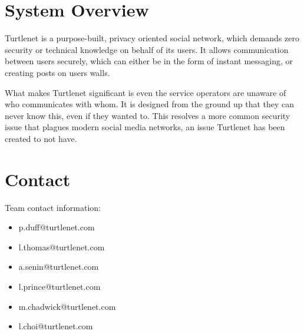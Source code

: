\section{System Overview}
Turtlenet is a purpose-built, privacy oriented social network, which demands
zero security or technical knowledge on behalf of its users. It allows
communication between users securely, which can either be in the form of 
instant messaging, or creating posts on users walls.

What makes Turtlenet significant is even the service operators are unaware of
who communicates with whom. It is designed from the ground up that they can never
know this, even if they wanted to. This resolves a more common security
issue that plagues modern social media networks, an issue Turtlenet has been
created to not have.

\section{Contact}
Team contact information:
\begin{itemize}
\item p.duff@turtlenet.com
\item l.thomas@turtlenet.com
\item a.senin@turtlenet.com
\item l.prince@turtlenet.com
\item m.chadwick@turtlenet.com
\item l.choi@turtlenet.com
\end{itemize}
